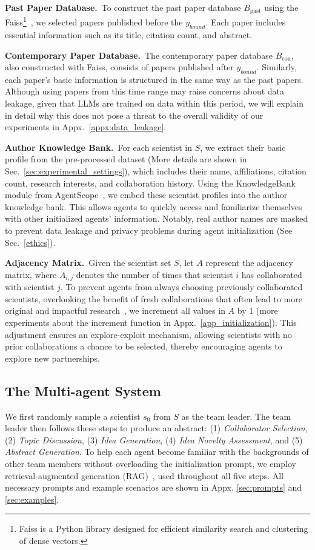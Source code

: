 \documentclass[11pt]{article}
\begin{document}
\noindent \textbf{Past Paper Database.}~To construct the past paper database $B_{\text{past}}$ using the Faiss\footnote{Faiss is a Python library designed for efficient similarity search and clustering of dense vectors.}~\cite{johnson2019billion}, we selected papers published before the $y_{bound}$. Each paper includes essential information such as its title, citation count, and abstract.

\noindent \textbf{Contemporary Paper Database.}~The contemporary paper database $B_{\text{con}}$, also constructed with Faiss, consists of papers published after $y_{bound}$. Similarly, each paper's basic information is structured in the same way as the past papers. Although using papers from this time range may raise concerns about data leakage, given that LLMs are trained on data within this period, we will explain in detail why this does not pose a threat to the overall validity of our experiments in Appx.~\ref{appx:data_leakage}.

\noindent \textbf{Author Knowledge Bank.}~For each scientist in $S$, we extract their basic profile from the pre-processed dataset (More details are shown in Sec.~\ref{sec:experimental_settings}), which includes their name, affiliations, citation count, research interests, and collaboration history. Using the KnowledgeBank module from AgentScope~\citep{agentscope}, we embed these scientist profiles into the author knowledge bank. This allows agents to quickly access and familiarize themselves with other initialized agents’ information. Notably, real author names are masked to prevent data leakage and privacy problems during agent initialization (See Sec.~\ref{ethics}).

\noindent \textbf{Adjacency Matrix.}~Given the scientist set $S$, let $A$ represent the adjacency matrix, where $A_{i,j}$ denotes the number of times that scientist $i$ has collaborated with scientist $j$. To prevent agents from always choosing previously collaborated scientists, overlooking the benefit of fresh collaborations that often lead to more original and impactful research~\citep{zeng2021fresh}, we increment all values in $A$ by 1 (more experiments about the increment function in Appx.~\ref{app_initialization}). 
This adjustment ensures an explore-exploit mechanism, allowing scientists with no prior collaborations a chance to be selected, thereby encouraging agents to explore new partnerships.

\subsection{The Multi-agent System}
We first randomly sample a scientist $s_{0}$ from $S$ as the team leader. The team leader then follows these steps to produce an abstract: (1) \textit{Collaborator Selection}, (2) \textit{Topic Discussion}, (3) \textit{Idea Generation}, (4) \textit{Idea Novelty Assessment}, and (5) \textit{Abstract Generation}. To help each agent become familiar with the backgrounds of other team members without overloading the initialization prompt, we employ retrieval-augmented generation (RAG)~\citep{lewis2020retrieval}, used throughout all five steps. All necessary prompts and example scenarios are shown in Appx. \ref{sec:prompts} and \ref{sec:examples}.
\end{document}
